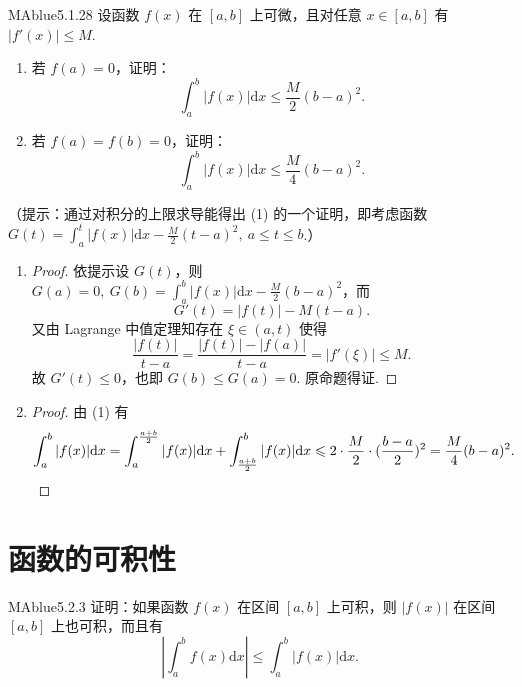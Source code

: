 \label{item:28}
\begin{problem}{MAblue}{5.1.28}
    设函数 $f(x)$ 在 $[a, b]$ 上可微，且对任意 $x \in [a, b]$ 有 $|f'(x)| \leqslant M$.
    \begin{enumerate}
        \item[(1)]
        若 $f(a) = 0$，证明：
        \[
            \int_a^b |f(x)| \mathrm dx \leqslant \frac M 2 (b-a)^2.
        \]
        \item[(2)]
        若 $f(a) = f(b) = 0$，证明：
        \[
            \int_a^b |f(x)| \mathrm dx \leqslant \frac M 4 (b-a)^2.
        \]
    \end{enumerate}
    （提示：通过对积分的上限求导能得出 (1) 的一个证明，即考虑函数 $G(t) = \int_a^t |f(x)| \mathrm dx - \frac M 2 (t-a)^2,\ a \leqslant t \leqslant b$.）
\end{problem}
\begin{enumerate}
    \item[(1)]
    \begin{proof}
        依提示设 $G(t)$，则 $G(a) = 0,\ G(b) = \int_a^b |f(x)| \mathrm dx - \frac M 2 (b-a)^2$，而
        \[
            G'(t) = |f(t)| - M(t - a).
        \]
        又由 Lagrange 中值定理知存在 $\xi \in (a, t)$ 使得
        \[
            \frac{|f(t)|}{t - a} = \frac{|f(t)| - |f(a)|}{t - a} = |f'(\xi)| \leqslant M.
        \]
        故 $G'(t) \leqslant 0$，也即 $G(b) \leqslant G(a) = 0$. 原命题得证.
    \end{proof}
    \item[(2)]
    \begin{proof}
        由 (1) 有
        \[
            \int_a^b |f(x)| \mathrm dx = \int_a^{\frac {a+b} 2} |f(x)| \mathrm dx + \int_{\frac {a+b} 2}^b |f(x)| \mathrm dx \leqslant 2 \cdot \frac M 2 \cdot (\frac {b-a} 2)^2 = \frac M 4 (b-a)^2. \qedhere
        \]
    \end{proof}
    
\end{enumerate}

\section{函数的可积性}

\begin{problem}{MAblue}{5.2.3}
    证明：如果函数 $f(x)$ 在区间 $[a, b]$ 上可积，则 $|f(x)|$ 在区间 $[a, b]$ 上也可积，而且有
    \[
        \left| \int_a^b f(x) \mathrm dx \right| \leqslant \int_a^b |f(x)| \mathrm dx.
    \]
\end{problem}

